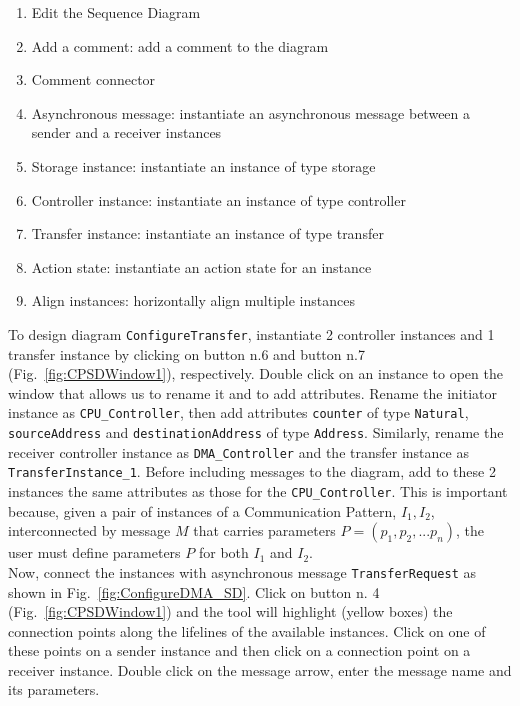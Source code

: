 \documentclass{llncs}
\begin{document}
\begin{enumerate}
	\item Edit the Sequence Diagram
	\item Add a comment: add a comment to the diagram
	\item Comment connector
	\item Asynchronous message: instantiate an asynchronous message between a sender and a receiver instances
	\item Storage instance: instantiate an instance of type storage
	\item Controller instance: instantiate an instance of type controller
	\item Transfer instance: instantiate an instance of type transfer
	\item Action state: instantiate an action state for an instance
	\item Align instances: horizontally align multiple instances
\end{enumerate}
%
To design diagram \texttt{ConfigureTransfer}, instantiate 2 controller instances and 1 transfer instance by clicking on
button n.6 and button n.7 (Fig.~\ref{fig:CPSDWindow1}), respectively. Double click on an instance to open the window
that allows us to rename it and to add attributes. Rename the initiator instance as \texttt{CPU\_Controller}, then add
attributes \texttt{counter} of type \texttt{Natural}, \texttt{sourceAddress} and \texttt{destinationAddress} of type
\texttt{Address}. Similarly, rename the receiver controller instance as \texttt{DMA\_Controller} and the transfer
instance as \texttt{TransferInstance\_1}. Before including messages to the diagram, add to these 2 instances the same
attributes as those for the \texttt{CPU\_Controller}. This is important because, given a pair of instances of a Communication
Pattern, $I_1,I_2$, interconnected by message $M$ that carries parameters $P=(p_1,p_2,...p_n)$, the user must define parameters $P$ for both $I_1$ and
$I_2$.\\
%
Now, connect the instances with asynchronous message \texttt{TransferRequest} as shown in Fig.~\ref{fig:ConfigureDMA_SD}. Click
on button n. 4 (Fig.~\ref{fig:CPSDWindow1}) and the tool will highlight (yellow boxes) the connection points along the
lifelines of the available instances. Click on one of these points on a sender instance and then click on a connection
point on a receiver instance. Double click on the message arrow, enter the message name and its parameters.\\
%
\end{document}
